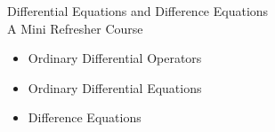 
\begin{frame}
Differential Equations and Difference Equations
\\
A Mini Refresher Course 
\begin{itemize}
 
\item Ordinary Differential Operators
 
\item Ordinary Differential Equations
 
\item Difference Equations

\end{itemize}

\end{frame}








